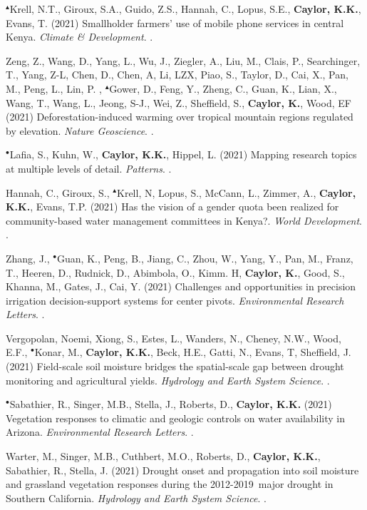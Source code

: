 \begin{etaremune}
\item $^{\blacktriangle}$Krell, N.T., Giroux, S.A., Guido, Z.S., Hannah, C., Lopus, S.E., \textbf{ Caylor, K.K.}, Evans, T. (2021) Smallholder farmers' use of mobile phone services in central Kenya. \emph{Climate \& Development}. .
\item Zeng, Z., Wang, D., Yang, L., Wu, J., Ziegler, A., Liu, M., Clais, P., Searchinger, T., Yang, Z-L, Chen, D., Chen, A, Li, LZX, Piao, S., Taylor, D., Cai, X., Pan, M., Peng, L., Lin, P. , $^{\blacktriangle}$Gower, D., Feng, Y., Zheng, C., Guan, K., Lian, X., Wang, T., Wang, L., Jeong, S-J., Wei, Z., Sheffield, S., \textbf{ Caylor, K.}, Wood, EF (2021) Deforestation-induced warming over tropical mountain regions regulated by elevation. \emph{Nature Geoscience}. .
\item $^{\bullet}$Lafia, S., Kuhn, W., \textbf{ Caylor, K.K.}, Hippel, L. (2021) Mapping research topics at multiple levels of detail. \emph{Patterns}. .
\item Hannah, C., Giroux, S., $^{\blacktriangle}$Krell, N, Lopus, S., McCann, L., Zimmer, A., \textbf{ Caylor, K.K.}, Evans, T.P. (2021) Has the vision of a gender quota been realized for community-based water management committees in Kenya?. \emph{World Development}. .
\item Zhang, J., $^{\bullet}$Guan, K., Peng, B., Jiang, C., Zhou, W., Yang, Y., Pan, M., Franz, T., Heeren, D., Rudnick, D., Abimbola, O., Kimm. H, \textbf{ Caylor, K.}, Good, S., Khanna, M., Gates, J., Cai, Y. (2021) Challenges and opportunities in precision irrigation decision-support systems for center pivots. \emph{Environmental Research Letters}. .
\item Vergopolan, Noemi, Xiong, S., Estes, L., Wanders, N., Cheney, N.W., Wood, E.F., $^{\bullet}$Konar, M., \textbf{ Caylor, K.K.}, Beck, H.E., Gatti, N., Evans, T, Sheffield, J. (2021) Field-scale soil moisture bridges the spatial-scale gap between drought monitoring and agricultural yields. \emph{Hydrology and Earth System Science}. .
\item $^{\bullet}$Sabathier, R., Singer, M.B., Stella, J., Roberts, D., \textbf{ Caylor, K.K.} (2021) Vegetation responses to climatic and geologic controls on water availability in Arizona. \emph{Environmental Research Letters}. .
\item Warter, M., Singer, M.B., Cuthbert, M.O., Roberts, D., \textbf{ Caylor, K.K.}, Sabathier, R., Stella, J. (2021) Drought onset and propagation into soil moisture and grassland vegetation responses during the 2012-2019 major drought in Southern California. \emph{Hydrology and Earth System Science}. .

\end{etaremune}
